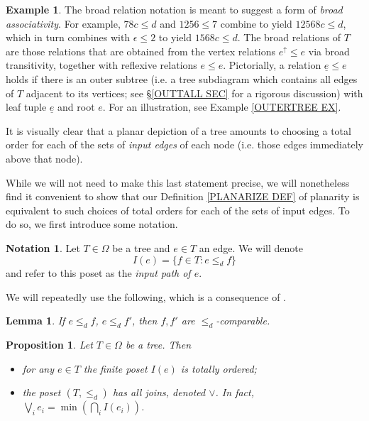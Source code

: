 \documentclass[a4paper,10pt
,draft
]{article}%
\numberwithin{equation}{section}
\numberwithin{figure}{section}
\newtheorem{lemma}[equation]{Lemma}%
\newtheorem{proposition}[equation]{Proposition}%
\theoremstyle{definition} %
\newtheorem{example}[equation]{Example}%
\newtheorem{notation}[equation]{Notation}%
\newcommand{\1}{\ensuremath{\mathbbm 1}}%
\begin{document}
\begin{example}
The broad relation notation is meant to suggest a form of 
\emph{broad associativity}. For example,
$78c \leq d$ and $1256 \leq 7$ combine to yield
$12568c \leq d$,
which
in turn combines with $\epsilon \leq 2$
to yield $1568c \leq d$.
The broad relations of $T$ are those relations that are obtained from the vertex relations $e^{\uparrow} \leq e$
via broad transitivity, together with reflexive relations
$e \leq e$.
Pictorially, a relation 
$\underline{e} \leq e$ holds 
if there is an outer subtree
(i.e. a tree subdiagram 
which contains all edges of $T$ adjacent to its vertices;
see \S \ref{OUTTALL SEC} for a rigorous discussion)
with leaf tuple 
$\underline{e}$ and root $e$.
For an illustration, see Example \ref{OUTERTREE EX}.
\end{example}


It is visually clear that a planar depiction of a tree amounts to choosing a total order for each of the sets of \textit{input edges} of each node (i.e. those edges immediately above that node).

While we will not need to make this last statement precise, we will nonetheless find it convenient to show that our Definition \ref{PLANARIZE DEF} of planarity is equivalent to such choices of total orders for each of the sets of input edges.
To do so, we first introduce some notation.


\begin{notation}\label{INPUTPATH NOT}
	Let $T \in \Omega$ be a tree and $e \in T$ an edge. We will denote
	\[ I(e) =\{f \in T \colon e \leq_d f \} \]
        and refer to this poset as the \textit{input path of $e$}.
\end{notation}

We will repeatedly use the following, which is a consequence of \cite[Cor. 5.25]{Pe17}.

\begin{lemma}\label{INCOMPNOTOP}
If $e \leq_d f$, $e \leq_d f'$, then $f,f'$ are $\leq_d$-comparable. 
\end{lemma}


\begin{proposition}\label{INPUTPATHS PROP}
	Let $T \in \Omega$ be a tree. Then
	\begin{itemize}
		\item[(a)] for any $e \in T$ the finite poset $I(e)$ is totally ordered;
		\item[(b)] the poset $(T,\leq_d)$ has all joins, denoted $\vee$. In fact, $\bigvee_{i} e_i = \min (\bigcap_{i} I(e_i))$.
	\end{itemize}
\end{proposition}
\end{document}
